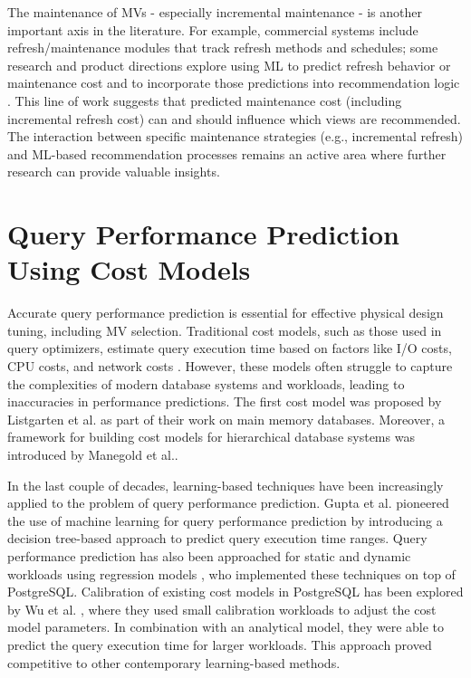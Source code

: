 The maintenance of \ac{MV}s - especially incremental maintenance - is another important axis in the literature. For example, commercial systems include refresh/maintenance modules that track refresh methods and schedules; some research and product directions explore using \ac{ML} to predict refresh behavior or maintenance cost and to incorporate those predictions into recommendation logic \cite{ahmed2020automated}. This line of work suggests that predicted maintenance cost (including incremental refresh cost) can and should influence which views are recommended. The interaction between specific maintenance strategies (e.g., incremental refresh) and \ac{ML}-based recommendation processes remains an active area where further research can provide valuable insights.

\section{Query Performance Prediction Using Cost Models}
\label{sec:query_performance_prediction}
Accurate query performance prediction is essential for effective physical design tuning, including \ac{MV} selection. Traditional cost models, such as those used in query optimizers, estimate query execution time based on factors like I/O costs, CPU costs, and network costs \cite{selinger1979access}. However, these models often struggle to capture the complexities of modern database systems and workloads, leading to inaccuracies in performance predictions. The first cost model was proposed by Listgarten et al. \cite{listgarten1997cost} as part of their work on main memory databases. Moreover, a framework for building cost models for hierarchical database systems was introduced by Manegold et al.\cite{manegold2002generic}.

In the last couple of decades, learning-based techniques have been increasingly applied to the problem of query performance prediction. Gupta et al. pioneered the use of machine learning for query performance prediction by introducing a decision tree-based approach to predict query execution time ranges\cite{gupta2008pqr}. Query performance prediction has also been approached for static and dynamic workloads using regression models \cite{akdere2012learning}, who implemented these techniques on top of PostgreSQL. Calibration of existing cost models in PostgreSQL has been explored by Wu et al. \cite{wu2013predicting}, where they used small calibration workloads to adjust the cost model parameters. In combination with an analytical model, they were able to predict the query execution time for larger workloads\cite{wu2013towards}. This approach proved competitive to other contemporary learning-based methods.

